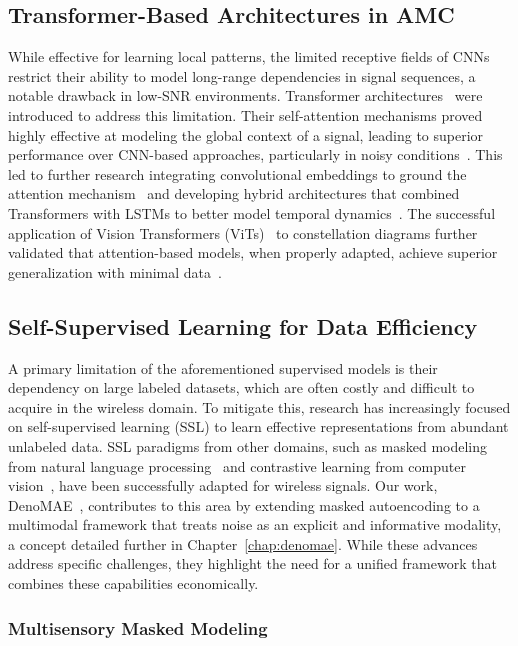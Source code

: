 \subsection{Transformer-Based Architectures in AMC}

While effective for learning local patterns, the limited receptive fields of CNNs restrict their ability to model long-range dependencies in signal sequences, a notable drawback in low-SNR environments. Transformer architectures~\cite{vaswani2017attention} were introduced to address this limitation. Their self-attention mechanisms proved highly effective at modeling the global context of a signal, leading to superior performance over CNN-based approaches, particularly in noisy conditions~\cite{cai2022signal}. This led to further research integrating convolutional embeddings to ground the attention mechanism~\cite{kong2023transformer} and developing hybrid architectures that combined Transformers with LSTMs to better model temporal dynamics~\cite{qu2024enhancing}. The successful application of Vision Transformers (ViTs)~\cite{dosovitskiy2020image} to constellation diagrams further validated that attention-based models, when properly adapted, achieve superior generalization with minimal data~\cite{}.

\subsection{Self-Supervised Learning for Data Efficiency}

A primary limitation of the aforementioned supervised models is their dependency on large labeled datasets, which are often costly and difficult to acquire in the wireless domain. To mitigate this, research has increasingly focused on self-supervised learning (SSL) to learn effective representations from abundant unlabeled data. SSL paradigms from other domains, such as masked modeling from natural language processing~\cite{devlin2019bert,he2022masked} and contrastive learning from computer vision~\cite{chen2020simple,he2020momentum}, have been successfully adapted for wireless signals. Our work, DenoMAE~\cite{faysal2025denomae}, contributes to this area by extending masked autoencoding to a multimodal framework that treats noise as an explicit and informative modality, a concept detailed further in Chapter~\ref{chap:denomae}. While these advances address specific challenges, they highlight the need for a unified framework that combines these capabilities economically.

\subsubsection{Multisensory Masked Modeling}

